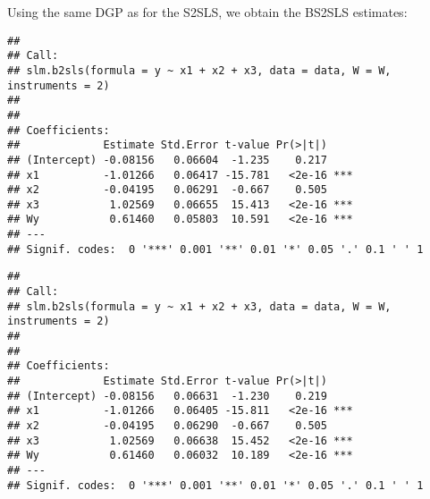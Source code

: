 \begin{knitrout}
\begin{kframe}
\begin{alltt}
  \hlstd{(}\hlstd{)}
  \hlopt{$}    \hlstd{=} \hlstd{,}  \hlstd{=} \hlstd{)}
  \hlstd{(}\hlstd{)}
\hlstd{\}}
\end{alltt}
\end{kframe}
\end{knitrout}

Using the same DGP as for the S2SLS, we obtain the BS2SLS estimates:
\begin{knitrout}
\color{fgcolor}\begin{kframe}
\begin{alltt}
 \hlkwb{<-}  \hlopt{~}  \hlopt{+}  \hlopt{+}       \hlstd{=} \hlstd{)}
  \hlstd{=} \hlstd{)}
\end{alltt}
\begin{verbatim}
## 
## Call:
## slm.b2sls(formula = y ~ x1 + x2 + x3, data = data, W = W, instruments = 2)
## 
## 
## Coefficients:
##             Estimate Std.Error t-value Pr(>|t|)    
## (Intercept) -0.08156   0.06604  -1.235    0.217    
## x1          -1.01266   0.06417 -15.781   <2e-16 ***
## x2          -0.04195   0.06291  -0.667    0.505    
## x3           1.02569   0.06655  15.413   <2e-16 ***
## Wy           0.61460   0.05803  10.591   <2e-16 ***
## ---
## Signif. codes:  0 '***' 0.001 '**' 0.01 '*' 0.05 '.' 0.1 ' ' 1
\end{verbatim}
\begin{alltt}
  \hlstd{=} \hlstd{)}
\end{alltt}
\begin{verbatim}
## 
## Call:
## slm.b2sls(formula = y ~ x1 + x2 + x3, data = data, W = W, instruments = 2)
## 
## 
## Coefficients:
##             Estimate Std.Error t-value Pr(>|t|)    
## (Intercept) -0.08156   0.06631  -1.230    0.219    
## x1          -1.01266   0.06405 -15.811   <2e-16 ***
## x2          -0.04195   0.06290  -0.667    0.505    
## x3           1.02569   0.06638  15.452   <2e-16 ***
## Wy           0.61460   0.06032  10.189   <2e-16 ***
## ---
## Signif. codes:  0 '***' 0.001 '**' 0.01 '*' 0.05 '.' 0.1 ' ' 1
\end{verbatim}
\end{kframe}
\end{knitrout}



